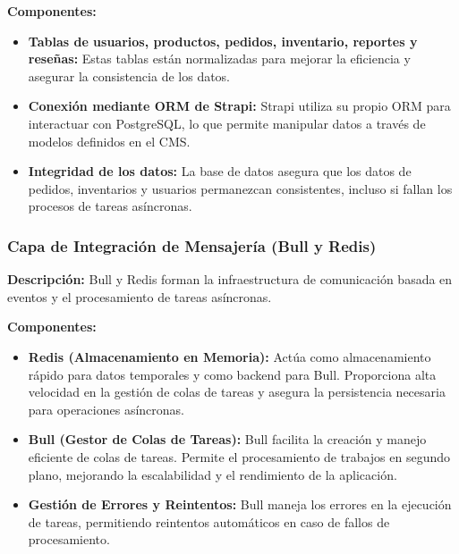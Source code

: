 \documentclass[12pt]{article}
\begin{document}
\begin{itemize}
    \textbf{Componentes:}
    \begin{itemize}
        \item \textbf{Tablas de usuarios, productos, pedidos, inventario, reportes y reseñas:} Estas tablas están normalizadas para mejorar la eficiencia y asegurar la consistencia de los datos.
        \item \textbf{Conexión mediante ORM de Strapi:} Strapi utiliza su propio ORM para interactuar con PostgreSQL, lo que permite manipular datos a través de modelos definidos en el CMS.
        \item \textbf{Integridad de los datos:} La base de datos asegura que los datos de pedidos, inventarios y usuarios permanezcan consistentes, incluso si fallan los procesos de tareas asíncronas.
    \end{itemize}

    \subsubsection{Capa de Integración de Mensajería (Bull y Redis)}
    \textbf{Descripción:} Bull y Redis forman la infraestructura de comunicación basada en eventos y el procesamiento de tareas asíncronas.

    \textbf{Componentes:}
    \begin{itemize}
        \item \textbf{Redis (Almacenamiento en Memoria):} Actúa como almacenamiento rápido para datos temporales y como backend para Bull. Proporciona alta velocidad en la gestión de colas de tareas y asegura la persistencia necesaria para operaciones asíncronas.
        \item \textbf{Bull (Gestor de Colas de Tareas):} Bull facilita la creación y manejo eficiente de colas de tareas. Permite el procesamiento de trabajos en segundo plano, mejorando la escalabilidad y el rendimiento de la aplicación.
        \item \textbf{Gestión de Errores y Reintentos:} Bull maneja los errores en la ejecución de tareas, permitiendo reintentos automáticos en caso de fallos de procesamiento.
    \end{itemize}
\end{itemize}
\end{document}
